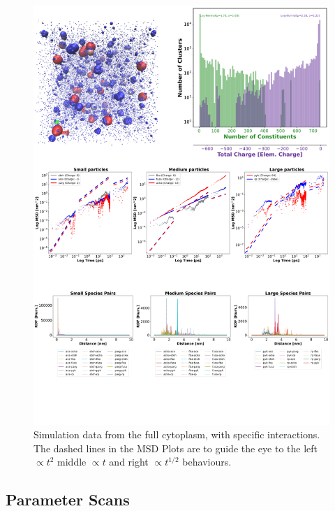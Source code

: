 \documentclass{article}
\begin{document}
\begin{figure}[!htbp]
\centering
\includegraphics[width=0.7\linewidth]{files/Fig8-efc86aafad27c0dca716926433b3ab15.png}
\caption[]{Simulation data from the full cytoplasm, with specific interactions. The dashed lines in the MSD Plots are to guide the eye to the left $\propto t^2$ middle $\propto t$ and right $\propto t^{1/2}$ behaviours.}
\label{Fig8_CytoSys}
\end{figure}

\subsection{Parameter Scans}
\end{document}
